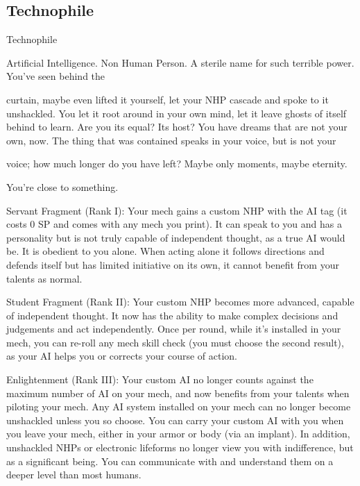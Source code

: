 \subsection{Technophile}

                                                  Technophile

Artificial Intelligence. Non Human Person. A sterile name for such terrible power. You’ve seen behind the

curtain, maybe even lifted it yourself, let your NHP cascade and spoke to it unshackled. You let it root
around in your own mind, let it leave ghosts of itself behind to learn. Are you its equal? Its host? You have
dreams that are not your own, now. The thing that was contained speaks in your voice, but is not your

voice; how much longer do you have left? Maybe only moments, maybe eternity.

You’re close to something.

Servant Fragment (Rank I): Your mech gains a custom NHP with the AI tag (it costs 0 SP and
comes with any mech you print). It can speak to you and has a personality but is not truly
capable of independent thought, as a true AI would be. It is obedient to you alone. When acting
alone it follows directions and defends itself but has limited initiative on its own, it cannot benefit
from your talents as normal.

Student Fragment (Rank II): Your custom NHP becomes more advanced, capable of
independent thought. It now has the ability to make complex decisions and judgements and act
independently. Once per round, while it’s installed in your mech, you can re-roll any mech skill
check (you must choose the second result), as your AI helps you or corrects your course of
action.

Enlightenment (Rank III): Your custom AI no longer counts against the maximum number of AI
on your mech, and now benefits from your talents when piloting your mech. Any AI system
installed on your mech can no longer become unshackled unless you so choose. You can carry
your custom AI with you when you leave your mech, either in your armor or body (via an implant).
In addition, unshackled NHPs or electronic lifeforms no longer view you with indifference, but as
a significant being. You can communicate with and understand them on a deeper level than most
humans.